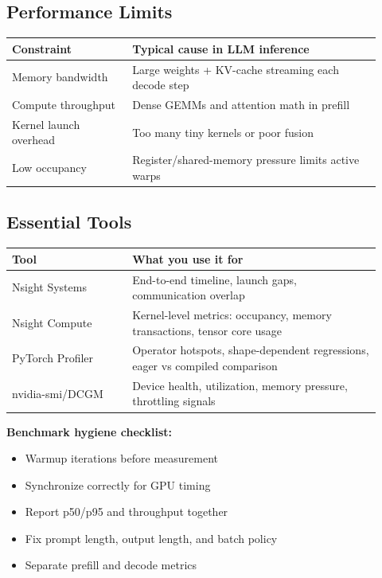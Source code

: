 \documentclass[11pt]{article}
\begin{document}
\subsection{Performance Limits}
\begin{center}
\begin{tabular}{|p{0.3\linewidth}|p{0.62\linewidth}|}
\hline
\textbf{Constraint} & \textbf{Typical cause in LLM inference} \\
\hline
Memory bandwidth & Large weights + KV-cache streaming each decode step \\
\hline
Compute throughput & Dense GEMMs and attention math in prefill \\
\hline
Kernel launch overhead & Too many tiny kernels or poor fusion \\
\hline
Low occupancy & Register/shared-memory pressure limits active warps \\
\hline
\end{tabular}
\end{center}

\subsection{Essential Tools}
\begin{center}
\begin{tabular}{|p{0.3\linewidth}|p{0.62\linewidth}|}
\hline
\textbf{Tool} & \textbf{What you use it for} \\
\hline
Nsight Systems & End-to-end timeline, launch gaps, communication overlap \\
\hline
Nsight Compute & Kernel-level metrics: occupancy, memory transactions, tensor core usage \\
\hline
PyTorch Profiler & Operator hotspots, shape-dependent regressions, eager vs compiled comparison \\
\hline
nvidia-smi/DCGM & Device health, utilization, memory pressure, throttling signals \\
\hline
\end{tabular}
\end{center}

\textbf{Benchmark hygiene checklist:}
\begin{itemize}[leftmargin=*]
\item Warmup iterations before measurement
\item Synchronize correctly for GPU timing
\item Report p50/p95 and throughput together
\item Fix prompt length, output length, and batch policy
\item Separate prefill and decode metrics
\end{itemize}
\end{document}
